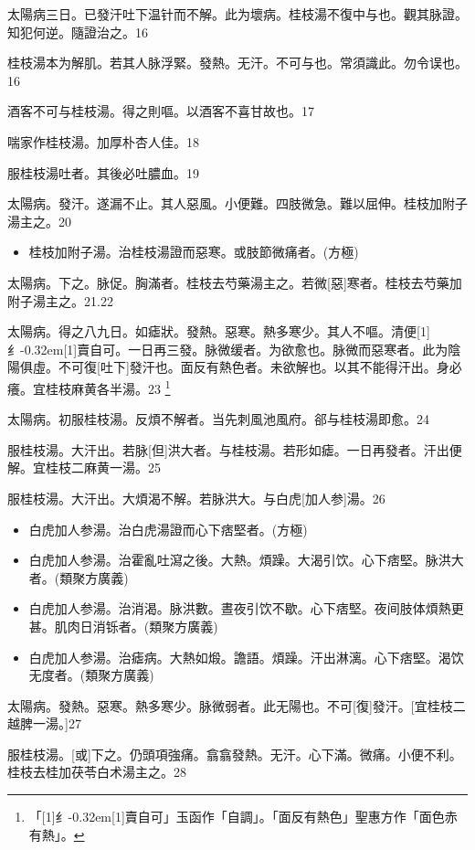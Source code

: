 \documentclass[oneside,b4paper]{ctexbook}
\begin{document}
\begin{flushleft}
太陽病三日。已發汗吐下温针而不解。此为壞病。桂枝湯不復中与也。觀其脉證。知犯何逆。隨證治之。16

桂枝湯本为解肌。若其人脉浮緊。發熱。无汗。不可与也。常須識此。勿令误也。16

酒客不可与桂枝湯。得之則嘔。以酒客不喜甘故也。17

喘家作桂枝湯。加厚朴杏人佳。18

服桂枝湯吐者。其後必吐膿血。19

太陽病。發汗。遂漏不止。其人惡風。小便難。四肢微急。難以屈伸。桂枝加附子湯主之。20

\begin{itemize}
\item 桂枝加附子湯。治桂枝湯證而惡寒。或肢節微痛者。(方極)
\end{itemize}

太陽病。下之。脉促。胸滿者。桂枝去芍藥湯主之。若微[惡]寒者。桂枝去芍藥加附子湯主之。21.22

太陽病。得之八九日。如瘧狀。發熱。惡寒。熱多寒少。其人不嘔。清便{\hbox{\scalebox{0.6}[1]{纟}\kern-0.32em\scalebox{0.7}[1]{賣}}}自可。一日再三發。脉微缓者。为欲愈也。脉微而惡寒者。此为陰陽俱虛。不可復[吐下]發汗也。面反有熱色者。未欲解也。以其不能得汗出。身必癢。宜桂枝麻黄各半湯。23
\footnote{「{\hbox{\scalebox{0.6}[1]{纟}\kern-0.32em\scalebox{0.7}[1]{賣}}}自可」玉函作「自調」。「面反有熱色」聖惠方作「面色赤有熱」。}

太陽病。初服桂枝湯。反煩不解者。当先刺風池風府。郤与桂枝湯即愈。24

服桂枝湯。大汗出。若脉[但]洪大者。与桂枝湯。若形如瘧。一日再發者。汗出便解。宜桂枝二麻黄一湯。25

服桂枝湯。大汗出。大煩渴不解。若脉洪大。与白虎[加人参]湯。26

\begin{itemize}
\item 白虎加人参湯。治白虎湯證而心下痞堅者。(方極)
\item 白虎加人参湯。治霍亂吐瀉之後。大熱。煩躁。大渴引饮。心下痞堅。脉洪大者。(類聚方廣義)
\item 白虎加人参湯。治消渴。脉洪數。晝夜引饮不歇。心下痞堅。夜间肢体煩熱更甚。肌肉日消铄者。(類聚方廣義)
\item 白虎加人参湯。治瘧病。大熱如煅。譫語。煩躁。汗出淋漓。心下痞堅。渴饮无度者。(類聚方廣義)
\end{itemize}

太陽病。發熱。惡寒。熱多寒少。脉微弱者。此无陽也。不可[復]發汗。[宜桂枝二越脾一湯。]27

服桂枝湯。[或]下之。仍頭項強痛。翕翕發熱。无汗。心下滿。微痛。小便不利。桂枝去桂加茯苓白术湯主之。28


\end{flushleft}
\end{document}
